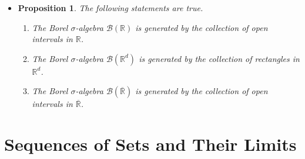 \documentclass[10pt]{article}
\newtheorem{proposition}[lemma]{Proposition}
\numberwithin{lemma}{section}
\newcommand{\mcal}[1]{\mathcal{#1}}
\newcommand{\Real}{\mathbb{R}}
\begin{document}
\begin{itemize}
  \item \begin{proposition} The following statements are true.
  \begin{enumerate}
    \item The Borel $\sigma$-algebra $\mcal{B}(\Real)$ is generated by the collection of open intervals in $\Real$.
    \item The Borel $\sigma$-algebra $\mcal{B}(\Real^d)$ is generated by the collection of rectangles in $\Real^d$.
    \item The Borel $\sigma$-algebra $\mcal{B}(\overline{\Real})$ is generated by the collection of open intervals in $\overline{\Real}$.
  \end{enumerate} 
  \end{proposition}
\end{itemize}

\section{Sequences of Sets and Their Limits}
\end{document}
